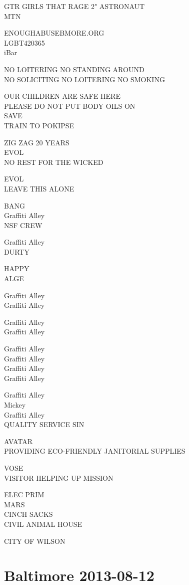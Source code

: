\documentclass[10pt,letterpaper]{article}
\begin{document}
GTR GIRLS THAT RAGE 2" ASTRONAUT\\
MTN

ENOUGHABUSEBMORE.ORG\\
LGBT420365\\
iBar

NO LOITERING NO STANDING AROUND\\
NO SOLICITING NO LOITERING NO SMOKING

OUR CHILDREN ARE SAFE HERE\\
PLEASE DO NOT PUT BODY OILS ON\\
SAVE\\
TRAIN TO POKIPSE

ZIG ZAG 20 YEARS\\
EVOL\\
NO REST FOR THE WICKED

EVOL\\
LEAVE THIS ALONE

BANG\\
Graffiti Alley\\
NSF CREW

Graffiti Alley\\
DURTY

HAPPY\\
ALGE

Graffiti Alley\\
Graffiti Alley

Graffiti Alley\\
Graffiti Alley

Graffiti Alley\\
Graffiti Alley\\
Graffiti Alley\\
Graffiti Alley

Graffiti Alley\\
Mickey\\
Graffiti Alley\\
QUALITY SERVICE SIN

AVATAR\\
PROVIDING ECO{-}FRIENDLY JANITORIAL SUPPLIES

VOSE\\
VISITOR HELPING UP MISSION

ELEC PRIM\\
MARS\\
CINCH SACKS\\
CIVIL ANIMAL HOUSE

CITY OF WILSON


\section*{Baltimore 2013-08-12}
\end{document}
